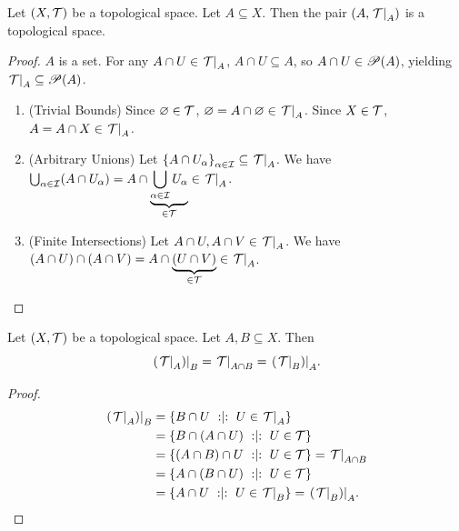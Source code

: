 \documentclass[11pt,reqno]{amsart}
\begin{document}
\begin{Prop}\label{prop:sub-topo}
Let $(X,\T)$ be a topological space. Let $A\subseteq X$.
Then the pair $(A,\eval{\T}_A)$ is a topological space.
\end{Prop}
\begin{proof}
$A$ is a set. For any $A\cap U\in\eval{\T}_A$, $A\cap U\subseteq A$, so
$A\cap U\in\P(A)$, yielding $\eval{\T}_A\subseteq\P(A)$.
\begin{enumerate}
\item (Trivial Bounds)
Since $\es\in\T$, $\es=A\cap\es\in\eval{\T}_A$.
Since $X\in\T$, $A=A\cap X\in\eval{\T}_A$.

\item (Arbitrary Unions)
Let $\set{A\cap U_\alpha}_{\alpha\in\I}\subseteq\eval{\T}_A$.
We have
$\bigcup_{\alpha\in\I}\Br{A\cap U_\alpha}=
A\cap\underbrace{\bigcup_{\alpha\in\I}U_\alpha}_{\in\T}\in\eval{\T}_A$.

\item (Finite Intersections)
Let $A\cap U,A\cap V\in\eval{\T}_A$.
We have $(A\cap U)\cap(A\cap V)=A\cap\underbrace{(U\cap V)}_{\in\T}\in\eval{\T}_A$.
\end{enumerate}
\end{proof}

\begin{Prop}\label{prop:iter-subspace}
Let $(X,\T)$ be a topological space. Let $A,B\subseteq X$.
Then
\[\eval{\Br{\eval{\T}_A}}_B=\eval{\T}_{A\cap B}=\eval{\Br{\eval{\T}_B}}_A.\]
\end{Prop}
\begin{proof}
\[\begin{aligned}
\eval{\Br{\eval{\T}_A}}_B
&=\set{B\cap U\st U\in\eval{\T}_A}\\
&=\set{B\cap (A\cap U)\st U\in\T}\\
&=\set{(A\cap B)\cap U\st U\in\T}=\eval{\T}_{A\cap B}\\
&=\set{A\cap (B\cap U)\st U\in\T}\\
&=\set{A\cap U\st U\in\eval{\T}_B}=\eval{\Br{\eval{\T}_B}}_A.\\
\end{aligned}\]
\end{proof}
\end{document}
